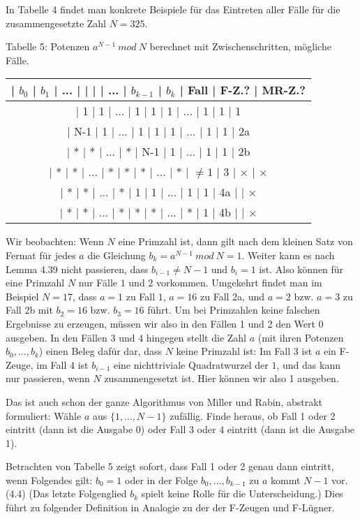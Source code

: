 \documentclass[a4paper]{article}
\begin{document}
\begin{multicols}{3}
        In Tabelle 4 findet man konkrete Beispiele für das Eintreten aller Fälle für die zusammengesetzte Zahl $N=325$.

        Tabelle 5: Potenzen $a^{N-1}\ mod\ N$ berechnet mit Zwischenschritten, mögliche Fälle.
        \begin{tabular}{c}
        | $b_0$ | $b_1$ | ... |   |   |   | ... | $b_{k-1}$ | $b_k$   | Fall | F-Z.?  | MR-Z.?  \\\hline
        | 1   | 1   | ... | 1  | 1  | 1  | ... | 1     | 1     | 1  \\
        | N-1  | 1   | ... | 1  | 1  | 1  | ... | 1     | 1     | 2a  \\
        | *   | *   | ... | *  | N-1 | 1  | ... | 1     | 1     | 2b  \\
        | *   | *   | ... | *  | *  | *  | ... | *     | $\not= 1$ | 3  | $\times$ | $\times$ \\
        | *   | *   | ... | *  | 1  | 1  | ... | 1     | 1     | 4a  |     | $\times$ \\
        | *   | *   | ... | *  | *  | *  | ... | *     | 1     | 4b  |     | $\times$ 
        \end{tabular}

        Wir beobachten: Wenn $N$ eine Primzahl ist, dann gilt nach dem kleinen Satz von Fermat für jedes $a$ die Gleichung $b_k=a^{N-1}\ mod\ N=1$. Weiter kann es nach Lemma 4.39 nicht passieren, dass $b_{i-1}\not=N-1$ und $b_i=1$ ist. Also können für eine Primzahl $N$ nur Fälle $1$ und $2$ vorkommen. Umgekehrt findet man im Beispiel $N=17$, dass $a=1$ zu Fall $1$, $a=16$ zu Fall 2a, und $a=2$ bzw. $a=3$ zu Fall 2b mit $b_2=16$ bzw. $b_3=16$ führt. Um bei Primzahlen keine falschen Ergebnisse zu erzeugen, müssen wir also in den Fällen 1 und 2 den Wert 0 ausgeben. In den Fällen 3 und 4 hingegen stellt die Zahl $a$ (mit ihren Potenzen $b_0,...,b_k$) einen Beleg dafür dar, dass $N$ keine Primzahl ist: Im Fall 3 ist $a$ ein F-Zeuge, im Fall 4 ist $b_{i-1}$ eine nichttriviale Quadratwurzel der $1$, und das kann nur passieren, wenn $N$ zusammengesetzt ist. Hier können wir also 1 ausgeben.

        Das ist auch schon der ganze Algorithmus von Miller und Rabin, abstrakt formuliert: Wähle $a$ aus $\{1,...,N-1\}$ zufällig. Finde heraus, ob Fall 1 oder 2 eintritt (dann ist die Ausgabe 0) oder Fall 3 oder 4 eintritt (dann ist die Ausgabe 1).

        Betrachten von Tabelle 5 zeigt sofort, dass Fall 1 oder 2 genau dann eintritt, wenn Folgendes gilt: $b_0=1$ oder in der Folge $b_0,...,b_{k-1}$ zu $a$ kommt $N-1$ vor. (4.4) (Das letzte Folgenglied $b_k$ spielt keine Rolle für die Unterscheidung.) Dies führt zu folgender Definition in Analogie zu der der F-Zeugen und F-Lügner.


\end{multicols}
\end{document}
